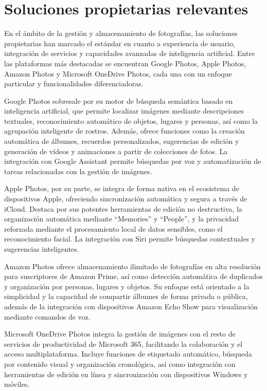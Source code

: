 \section{Soluciones propietarias relevantes}

En el ámbito de la gestión y almacenamiento de fotografías, las soluciones propietarias han marcado el estándar en cuanto a experiencia de usuario, integración de servicios y capacidades avanzadas de inteligencia artificial. Entre las plataformas más destacadas se encuentran Google Photos, Apple Photos, Amazon Photos y Microsoft OneDrive Photos, cada una con un enfoque particular y funcionalidades diferenciadoras.

Google Photos sobresale por su motor de búsqueda semántica basado en inteligencia artificial, que permite localizar imágenes mediante descripciones textuales, reconocimiento automático de objetos, lugares y personas, así como la agrupación inteligente de rostros. Además, ofrece funciones como la creación automática de álbumes, recuerdos personalizados, sugerencias de edición y generación de vídeos y animaciones a partir de colecciones de fotos. La integración con Google Assistant permite búsquedas por voz y automatización de tareas relacionadas con la gestión de imágenes.

Apple Photos, por su parte, se integra de forma nativa en el ecosistema de dispositivos Apple, ofreciendo sincronización automática y segura a través de iCloud. Destaca por sus potentes herramientas de edición no destructiva, la organización automática mediante “Memories” y “People”, y la privacidad reforzada mediante el procesamiento local de datos sensibles, como el reconocimiento facial. La integración con Siri permite búsquedas contextuales y sugerencias inteligentes.

Amazon Photos ofrece almacenamiento ilimitado de fotografías en alta resolución para suscriptores de Amazon Prime, así como detección automática de duplicados y organización por personas, lugares y objetos. Su enfoque está orientado a la simplicidad y la capacidad de compartir álbumes de forma privada o pública, además de la integración con dispositivos Amazon Echo Show para visualización mediante comandos de voz.

Microsoft OneDrive Photos integra la gestión de imágenes con el resto de servicios de productividad de Microsoft 365, facilitando la colaboración y el acceso multiplataforma. Incluye funciones de etiquetado automático, búsqueda por contenido visual y organización cronológica, así como integración con herramientas de edición en línea y sincronización con dispositivos Windows y móviles.

